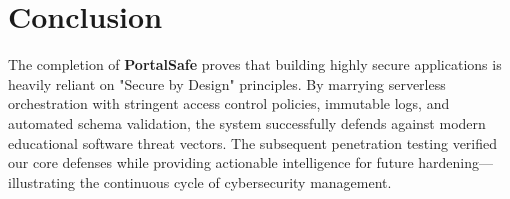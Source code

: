 \documentclass[12pt,a4paper]{report}
\begin{document}
\chapter*{Conclusion}
The completion of \textbf{PortalSafe} proves that building highly secure applications is heavily reliant on "Secure by Design" principles. By marrying serverless orchestration with stringent access control policies, immutable logs, and automated schema validation, the system successfully defends against modern educational software threat vectors. The subsequent penetration testing verified our core defenses while providing actionable intelligence for future hardening—illustrating the continuous cycle of cybersecurity management.
\end{document}
